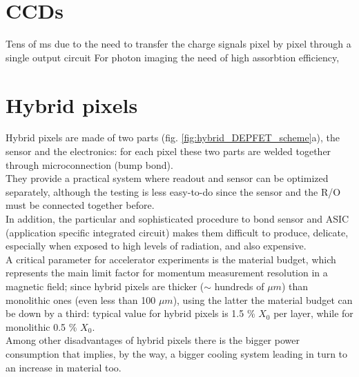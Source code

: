     
\section{CCDs}
Tens of \si{ms} due to the need to transfer the charge signals pixel by pixel through a single output circuit
For photon imaging the need of high assorbtion efficiency, 

\section{Hybrid pixels}
   Hybrid pixels are made of two parts (fig. \ref{fig:hybrid_DEPFET_scheme}a), the sensor and the electronics: for each pixel these two parts are welded together through microconnection (bump bond).\\  
   They provide a practical system where readout and sensor can be optimized separately, although the testing is less easy-to-do since the sensor and the R/O must be connected together before.\\
   In addition, the particular and sophisticated procedure to bond sensor and ASIC (application specific integrated circuit) makes them difficult to produce, delicate, especially when exposed to high levels of radiation, and also expensive. \\
   A critical parameter for accelerator experiments is the material budget, which represents the main limit factor for momentum measurement resolution in a magnetic field; since hybrid pixels are thicker ($\sim$ hundreds of $\mu m$) than monolithic ones (even less than 100 $\mu m$), using the latter the material budget can be down by a third: typical value for hybrid pixels is 1.5 \% $X_0$ per layer, while for monolithic 0.5 \% $X_0$.\\
   Among other disadvantages of hybrid pixels there is the bigger power consumption that implies, by the way, a bigger cooling system leading in turn to an increase in material too.\\

